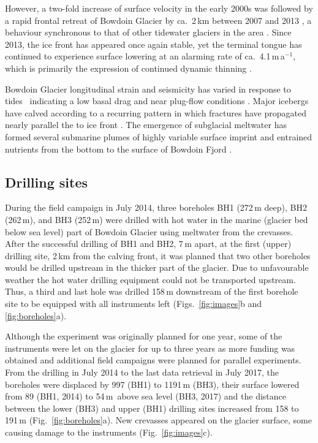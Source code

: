 \documentclass[utf8]{article}
\begin{document}
    However, a two-fold increase of surface velocity in the early 2000s was
    followed by a rapid frontal retreat of Bowdoin Glacier by ca.~2\,km between
    2007 and 2013 \citep[Fig.~2 of][]{Sugiyama.etal.2015}, a behaviour
    synchronous to that of other tidewater glaciers in the area
    \citep{Sakakibara.Sugiyama.2018}. Since 2013, the ice front has appeared
    once again stable, yet the terminal tongue has continued to experience
    surface
    lowering at an alarming rate of ca.~4.1\,m\,a$^{-1}$, which is primarily
    the expression of continued dynamic thinning \citep{Tsutaki.etal.2016}.

    Bowdoin Glacier longitudinal strain and seismicity has varied in response
    to
    tides~\citep{Podolskiy.etal.2016, Podolskiy.etal.2017} indicating a low
    basal drag and near plug-flow conditions \citep{Seddik.etal.2019}. Major
    icebergs have calved according to a recurring pattern in which fractures
    have propagated nearly parallel the to ice front \citep{Jouvet.etal.2017}.
    The emergence of subglacial meltwater has formed several submarine plumes
    of highly variable surface imprint \citep{Jouvet.etal.2018} and entrained
    nutrients
    from the bottom to the surface of Bowdoin Fjord \citep{Kanna.etal.2018}.


\subsection{Drilling sites}

    During the field campaign in July 2014, three boreholes BH1 (272\,m deep),
    BH2 (262\,m), and BH3 (252\,m) were drilled with hot water in the marine
    (glacier bed below sea level) part of Bowdoin Glacier
    using meltwater from the crevasses. After the successful drilling of BH1
    and BH2, 7\,m apart, at the first (upper) drilling site, 2\,km from the
    calving front, it was planned that two other boreholes would be drilled
    upstream in the thicker part of the glacier. Due to unfavourable weather the
    hot water drilling equipment could not be transported upstream.
    Thus, a third
    and last hole was drilled 158\,m downstream of the first borehole site
    to be equipped with all instruments left (Figs.~\ref{fig:images}b and
    \ref{fig:boreholes}a).

    Although the experiment was originally planned for one year, some of the
    instruments were let on the glacier for up to three years as more funding
    was obtained and additional field campaigns were planned for parallel
    experiments. From the drilling in July 2014 to the last data retrieval in
    July 2017, the boreholes were displaced by 997 (BH1) to 1191\,m (BH3),
    their surface lowered from 89 (BH1, 2014) to 54\,m~above sea level
    (BH3, 2017) and
    the distance between the lower (BH3) and upper (BH1) drilling sites
    increased from 158 to 191\,m (Fig.~\ref{fig:boreholes}a). New crevasses
    appeared on the glacier surface, some causing damage to the instruments
    (Fig.~\ref{fig:images}c).
\end{document}
